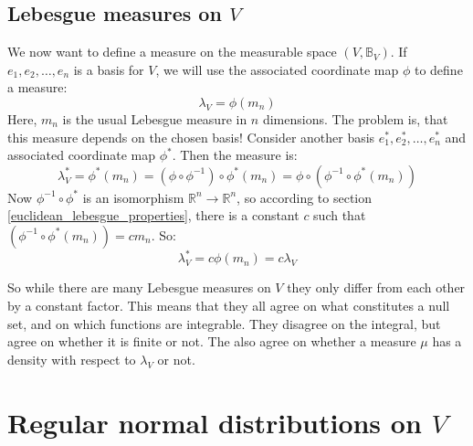 \documentclass[12pt, a4paper]{article}
\numberwithin{equation}{section}
\begin{document}
\subsection{Lebesgue measures on $V$}
We now want to define a measure on the measurable space $(V,\mathbb{B}_V)$. If $e_1, e_2,\ldots, e_n$ is a basis for $V$, we will use the associated coordinate map $\phi$ to define a measure:
\begin{equation}
\lambda_V=\phi(m_n)
\end{equation}
Here, $m_n$ is the usual Lebesgue measure in $n$ dimensions. The problem is, that this measure depends on the chosen basis! Consider another basis $e^*_1, e^*_2,\ldots,e^*_n$ and associated coordinate map $\phi^*$. Then the measure is:
\begin{equation}
\lambda^*_V=\phi^*(m_n)=(\phi\circ\phi^{-1})\circ\phi^*(m_n)=\phi\circ(\phi^{-1}\circ\phi^*(m_n))
\end{equation}
Now $\phi^{-1}\circ\phi^*$ is an isomorphism $\mathbb{R}^n\rightarrow\mathbb{R}^n$, so according to section \ref{euclidean_lebesgue_properties}, there is a constant $c$ such that $(\phi^{-1}\circ\phi^*(m_n))=c m_n$. So:
\begin{equation}
\lambda^*_V=c\phi(m_n)=c\lambda_V
\end{equation}

So while there are many Lebesgue measures on $V$ they only differ from each other by a constant factor. This means that they all agree on what constitutes a null set, and on which functions are integrable. They disagree on the integral, but agree on whether it is finite or not. The also agree on whether a measure $\mu$ has a density with respect to $\lambda_V$ or not.

\section{Regular normal distributions on $V$}
\end{document}
